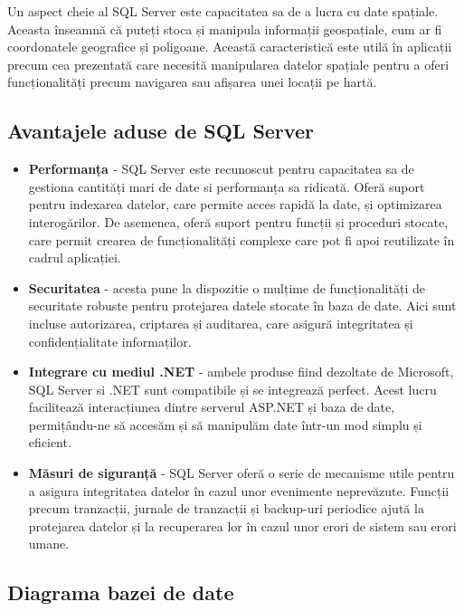 Un aspect cheie al SQL Server este capacitatea sa de a lucra cu date spațiale. Aceasta înseamnă că puteți stoca și manipula informații geospațiale, cum ar fi coordonatele geografice și poligoane. Această caracteristică este utilă în aplicații precum cea prezentată care necesită manipularea datelor spațiale pentru a oferi funcționalități precum navigarea sau afișarea unei locații pe hartă.

\subsection{Avantajele aduse de SQL Server}

\begin{itemize}
    \item \textbf{Performanța \cite{sqlServer_performance}} - SQL Server este recunoscut pentru capacitatea sa de gestiona cantități mari de date si performanța sa ridicată. Oferă suport pentru indexarea datelor, care permite acces rapidă la date, și optimizarea interogărilor. De asemenea, oferă suport pentru funcții și proceduri stocate, care permit crearea de funcționalități complexe care pot fi apoi reutilizate în cadrul aplicației.
    \item \textbf{Securitatea} - acesta pune la dispozitie o mulțime de funcționalități de securitate robuste pentru protejarea datele stocate în baza de date. Aici sunt incluse autorizarea, criptarea și auditarea, care asigură integritatea și confidențialitate informaților.

    \item \textbf{Integrare cu mediul .NET} - ambele produse fiind dezoltate de Microsoft, SQL Server si .NET sunt compatibile și se integrează perfect. Acest lucru facilitează interacțiunea dintre serverul ASP.NET și baza de date, permițându-ne să accesăm și să manipulăm date într-un mod simplu și eficient.
    \item \textbf{Măsuri de siguranță} - SQL Server oferă o serie de mecanisme utile pentru a asigura integritatea datelor în cazul unor evenimente neprevăzute. Funcții precum tranzacții, jurnale de tranzacții și backup-uri periodice ajută la protejarea datelor și la recuperarea lor în cazul unor erori de sistem sau erori umane.
\end{itemize}

\newpage

\subsection{Diagrama bazei de date}

